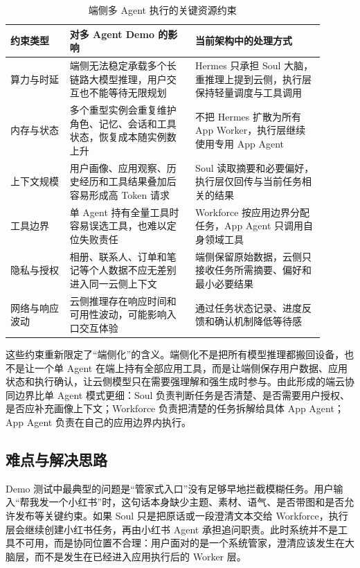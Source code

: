 \begin{table}[h]
\centering
\begin{tabular}{p{0.17\linewidth}p{0.36\linewidth}p{0.37\linewidth}}
\hline
\textbf{约束类型} & \textbf{对多 Agent Demo 的影响} & \textbf{当前架构中的处理方式} \\
\hline
算力与时延 & 端侧无法稳定承载多个长链路大模型推理，用户交互也不能等待无限规划 & Hermes 只承担 Soul 大脑，重推理上提到云侧，执行层保持轻量调度与工具调用 \\
内存与状态 & 多个重型实例会重复维护角色、记忆、会话和工具状态，恢复成本随实例数上升 & 不把 Hermes 扩散为所有 App Worker，执行层继续使用专用 App Agent \\
上下文规模 & 用户画像、应用观察、历史经历和工具结果叠加后容易形成高 Token 请求 & Soul 读取摘要和必要偏好，执行层仅回传与当前任务相关的结果 \\
工具边界 & 单 Agent 持有全量工具时容易误选工具，也难以定位失败责任 & Workforce 按应用边界分配任务，App Agent 只调用自身领域工具 \\
隐私与授权 & 相册、联系人、订单和笔记等个人数据不应无差别进入同一云侧上下文 & 端侧保留原始数据，云侧只接收任务所需摘要、偏好和最小必要结果 \\
网络与响应波动 & 云侧推理存在响应时间和可用性波动，可能影响入口交互体验 & 通过任务状态记录、进度反馈和确认机制降低等待感 \\
\hline
\end{tabular}
\caption{端侧多 Agent 执行的关键资源约束}
\label{tab:rt4-edge-constraints}
\end{table}

这些约束重新限定了“端侧化”的含义。端侧化不是把所有模型推理都搬回设备，也不是让一个单 Agent 在端上持有全部应用工具，而是让端侧保存用户数据、应用状态和执行确认，让云侧模型只在需要强理解和强生成时参与。由此形成的端云协同边界比单 Agent 模式更细：Soul 负责判断任务是否清楚、是否需要用户授权、是否应补充画像上下文；Workforce 负责把清楚的任务拆解给具体 App Agent；App Agent 负责在自己的应用边界内执行。

\subsection{难点与解决思路}

Demo 测试中最典型的问题是“管家式入口”没有足够早地拦截模糊任务。用户输入“帮我发一个小红书”时，这句话本身缺少主题、素材、语气、是否带图和是否允许发布等关键约束。如果 Soul 只是把原话或一段澄清文本交给 Workforce，执行层会继续创建小红书任务，再由小红书 Agent 承担追问职责。此时系统并不是工具不可用，而是协同位置不合理：用户面对的是一个系统管家，澄清应该发生在大脑层，而不是发生在已经进入应用执行后的 Worker 层。

